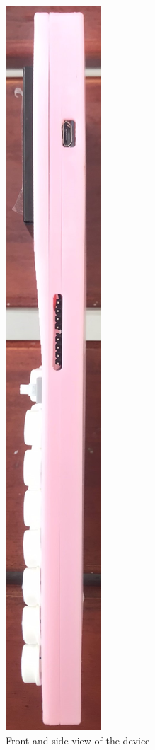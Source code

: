 \documentclass[a4paper, twoside]{report}
\begin{document}
\begin{figure}[H]
    \includegraphics[height=.7\textheight]{3DCase/rightside_view.jpg}
    \caption{Front and side view of the device}
\end{figure}

\newpage
\end{document}
